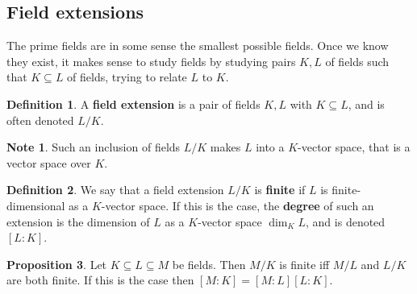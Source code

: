 \documentclass{article}
\renewcommand{\sb}[1]{\left[ #1 \right]}
\theoremstyle{definition}\newtheorem{definition}{Definition}[section]
\theoremstyle{definition}\newtheorem{remark}[definition]{Remark}
\theoremstyle{definition}\newtheorem*{example}{Example}
\theoremstyle{definition}\newtheorem*{note}{Note}
\newtheorem{proposition}[definition]{Proposition}
\begin{document}
\subsection{Field extensions}

The prime fields are in some sense the smallest possible fields. Once we know they exist, it makes sense to study fields by studying pairs $ K, L $ of fields such that $ K \subseteq L $ of fields, trying to relate $ L $ to $ K $.

\begin{definition}
A \textbf{field extension} is a pair of fields $ K, L $ with $ K \subseteq L $, and is often denoted $ L / K $.
\end{definition}

\begin{note}
Such an inclusion of fields $ L / K $ makes $ L $ into a $ K $-vector space, that is a vector space over $ K $.
\end{note}

\begin{definition}
We say that a field extension $ L / K $ is \textbf{finite} if $ L $ is finite-dimensional as a $ K $-vector space. If this is the case, the \textbf{degree} of such an extension is the dimension of $ L $ as a $ K $-vector space $ \dim_KL $, and is denoted $ \sb{L : K} $.
\end{definition}

\begin{proposition}
Let $ K \subseteq L \subseteq M $ be fields. Then $ M / K $ is finite iff $ M / L $ and $ L / K $ are both finite. If this is the case then $ \sb{M : K} = \sb{M : L}\sb{L : K} $.
\end{proposition}
\end{document}
